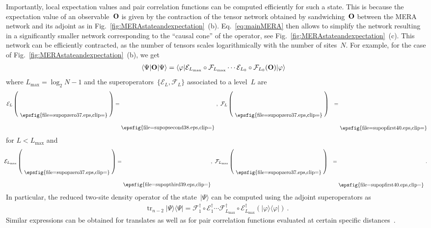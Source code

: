 \documentclass[floats,prb,twocolumn]{revtex4}
\newcommand*{\cE}{\mathcal{E}}
\newcommand*{\cF}{\mathcal{F}}
\newcommand*{\tr}{\mathop{\mathrm{tr}}\nolimits}
\newcommand{\ket}[1]{|#1\rangle}
\newcommand{\bra}[1]{\langle#1|}
\newcommand{\proj}[1]{|#1\rangle\langle#1|}
\newcommand*{\Xsingleoperator}{{\bf O}}
\newcommand*{\supopzero}{\raisebox{-21.123pt}{\epsfig{file=supopzero37.eps,clip=}}}
\newcommand*{\supopsecond}{\raisebox{-44.523pt}{\epsfig{file=supopsecond38.eps,clip=}}}
\newcommand*{\supopthird}{\raisebox{-44.523pt}{\epsfig{file=supopthird39.eps,clip=}}}
\newcommand*{\supopfirst}{\raisebox{-45.243pt}{\epsfig{file=supopfirst40.eps,clip=}}}
\begin{document}
Importantly, local expectation values and pair correlation functions can be computed efficiently for such a state. This is because the expectation value of an observable~$\Xsingleoperator$ is given by the contraction of  the tensor network obtained by sandwiching~$\Xsingleoperator$ between the MERA network and its adjoint as in Fig.~\ref{fig:MERAstateandexpectation}~(b). Eq.~\eqref{eq:mainMERA} then allows to  simplify the network  resulting in a significantly smaller network corresponding to the ``causal cone'' of the operator, see Fig.~\ref{fig:MERAstateandexpectation}~(c). This network can be efficiently contracted, as the number of tensors scales logarithmically with the number of sites~$N$. For example, for the case of Fig.~\ref{fig:MERAstateandexpectation}~(b), we get 
\begin{align}
\bra{\Psi}\Xsingleoperator\ket{\Psi}&=\bra{\varphi}\cE_{L_{\max}}\circ\cF_{L_{\max}}\cdots\cE_{L_0}\circ \cF_{L_0} (\Xsingleoperator)\ket{\varphi} \label{eq:vdf}
\end{align}
where $L_{\max}=\log_2 N-1$ and the superoperators~$\{\cE_L,\cF_L\}$
associated to a level~$L$ are 
\begin{align}
\cE_L\left(\ \supopzero\ \right)&=\supopsecond\ ,\  \cF_L\left(\ \supopzero\ \right)&=\supopfirst\label{eq:extraction}
\end{align}
for $L<L_{\max}$ and 
\begin{align}
\hspace{-1ex}\cE_{L_{\max}}\left(\ \supopzero\ \right)&=\supopthird,\ \cF_{L_{\max}}\left(\ \supopzero\ \right)&=\supopfirst\ .\label{eq:extractionb}
\end{align}
In particular, the reduced two-site density operator of the state~$\ket{\Psi}$ can be computed using the adjoint superoperators as
\begin{align*}
\tr_{n-2}\proj{\Psi}=\cF^\dagger_1\circ\cE^\dagger_1\cdots\cF^{\dagger}_{L_{\max}}\circ\cE^\dagger_{L_{\max}}(\proj{\varphi})\ .
\end{align*}
Similar expressions can be  obtained for translates as well as for pair correlation functions evaluated at certain specific distances~\cite{Giovannettietal08,Pfeiferetal09,silvietal09}.
\end{document}

